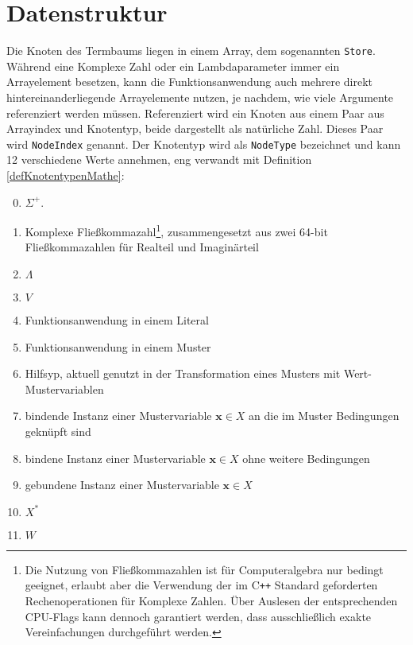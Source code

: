 \section{Datenstruktur}
Die Knoten des Termbaums liegen in einem Array, dem sogenannten \verb|Store|. Während eine Komplexe Zahl oder ein Lambdaparameter immer ein Arrayelement besetzen, kann die Funktionsanwendung auch mehrere direkt hintereinanderliegende Arrayelemente nutzen, je nachdem, wie viele Argumente referenziert werden müssen. Referenziert wird ein Knoten aus einem Paar aus Arrayindex und Knotentyp, beide dargestellt als natürliche Zahl. Dieses Paar wird \verb|NodeIndex| genannt. Der Knotentyp wird als \verb|NodeType| bezeichnet und kann 12 verschiedene Werte annehmen, eng verwandt mit Definition \ref{defKnotentypenMathe}:
\begin{enumerate}
	\setcounter{enumi}{-1} %
	\item {$\Sigma^+$.}
	\item {Komplexe Fließkommazahl\footnote{Die Nutzung von Fließkommazahlen ist für Computeralgebra nur bedingt geeignet, erlaubt aber die Verwendung der im C\texttt{++} Standard geforderten Rechenoperationen für Komplexe Zahlen. Über Auslesen der entsprechenden CPU-Flags kann dennoch garantiert werden, dass ausschließlich exakte Vereinfachungen durchgeführt werden.}, zusammengesetzt aus zwei 64-bit Fließkommazahlen für Realteil und Imaginärteil}
	\item {$\Lambda$}
	\item {$V$}
	\item {Funktionsanwendung in einem Literal}
	\item {Funktionsanwendung in einem Muster}
	\item {Hilfsyp, aktuell genutzt in der Transformation eines Musters mit Wert-Mustervariablen}
	\item {bindende Instanz einer Mustervariable $\mathbf x \in X$ an die im Muster Bedingungen geknüpft sind}
	\item {bindene Instanz einer Mustervariable $\mathbf x \in X$ ohne weitere Bedingungen}
	\item {gebundene Instanz einer Mustervariable $\mathbf x \in X$}
	\item {$X^*$}
	\item {$W$}
\end{enumerate}
